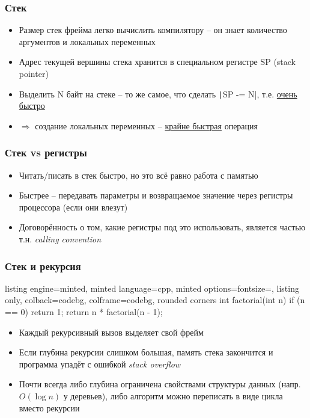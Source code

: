 \documentclass[10pt]{beamer}
\begin{document}
\begin{frame}[fragile]
\frametitle{Стек}
\begin{itemize}
\item Размер стек фрейма легко вычислить компилятору -- он знает количество аргументов и локальных переменных
\pause
\item Адрес текущей вершины стека хранится в специальном регистре SP (stack pointer)
\pause
\item Выделить N байт на стеке -- то же самое, что сделать \texttt|SP -= N|, т.е. \underline{очень быстро}
\pause
\item \(\Longrightarrow\) создание локальных переменных -- \underline{крайне быстрая} операция
\end{itemize}
\end{frame}

\begin{frame}[fragile]
\frametitle{Стек vs регистры}
\begin{itemize}
\item Читать/писать в стек быстро, но это всё равно работа с памятью
\pause
\item Быстрее -- передавать параметры и возвращаемое значение через регистры процессора (если они влезут)
\pause
\item Договорённость о том, какие регистры под это использовать, является частью т.н. \textit{calling convention}
\end{itemize}
\end{frame}

\begin{frame}[fragile]
\frametitle{Стек и рекурсия}
\begin{tcblisting}{listing engine=minted, minted language=cpp, minted options={fontsize=\scriptsize}, listing only, colback=codebg, colframe=codebg, rounded corners}
int factorial(int n) {
  if (n == 0) {
    return 1;
  }
  return n * factorial(n - 1);
}
\end{tcblisting}
\pause
\begin{itemize}
\item Каждый рекурсивный вызов выделяет свой фрейм
\pause
\item Если глубина рекурсии слишком большая, память стека закончится и программа упадёт с ошибкой \textit{stack overflow}
\pause
\item Почти всегда либо глубина ограничена свойствами структуры данных (напр. \(O(\log n)\) у деревьев), либо алгоритм можно переписать в виде цикла вместо рекурсии
\end{itemize}
\end{frame}
\end{document}
